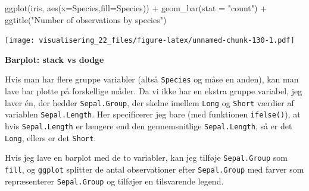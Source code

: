 \documentclass[
]{book}
\newenvironment{Shaded}{\begin{snugshade}}{\end{snugshade}}
\newcommand{\AttributeTok}[1]{\textcolor[rgb]{0.77,0.63,0.00}{#1}}
\newcommand{\FunctionTok}[1]{\textcolor[rgb]{0.00,0.00,0.00}{#1}}
\newcommand{\NormalTok}[1]{#1}
\newcommand{\OtherTok}[1]{\textcolor[rgb]{0.56,0.35,0.01}{#1}}
\newcommand{\SpecialCharTok}[1]{\textcolor[rgb]{0.00,0.00,0.00}{#1}}
\newcommand{\StringTok}[1]{\textcolor[rgb]{0.31,0.60,0.02}{#1}}
\begin{document}
\begin{Shaded}
\begin{Highlighting}[]
\FunctionTok{ggplot}\NormalTok{(iris, }\FunctionTok{aes}\NormalTok{(}\AttributeTok{x=}\NormalTok{Species,}\AttributeTok{fill=}\NormalTok{Species)) }\SpecialCharTok{+} 
  \FunctionTok{geom\_bar}\NormalTok{(}\AttributeTok{stat =} \StringTok{"count"}\NormalTok{) }\SpecialCharTok{+}
  \FunctionTok{ggtitle}\NormalTok{(}\StringTok{"Number of observations by species"}\NormalTok{)}
\end{Highlighting}
\end{Shaded}

\texttt{[image: visualisering\_22\_files/figure-latex/unnamed-chunk-130-1.pdf]}

\textbf{Barplot: stack vs dodge}

Hvis man har flere gruppe variabler (altså \texttt{Species} og måse en anden), kan man lave bar plotte på forskellige måder. Da vi ikke har en ekstra gruppe variabel, jeg laver én, der hedder \texttt{Sepal.Group}, der skelne imellem \texttt{Long} og \texttt{Short} værdier af variablen \texttt{Sepal.Length}. Her specificerer jeg bare (med funktionen \texttt{ifelse()}), at hvis \texttt{Sepal.Length} er længere end den gennemsnitlige \texttt{Sepal.Length}, så er det \texttt{Long}, ellers er det \texttt{Short}.

Hvis jeg lave en barplot med de to variabler, kan jeg tilføje \texttt{Sepal.Group} som \texttt{fill}, og \texttt{ggplot} splitter de antal observationer efter \texttt{Sepal.Group} med farver som repræsenterer \texttt{Sepal.Group} og tilføjer en tilsvarende legend.

\begin{Shaded}
\end{Shaded}
\end{document}
